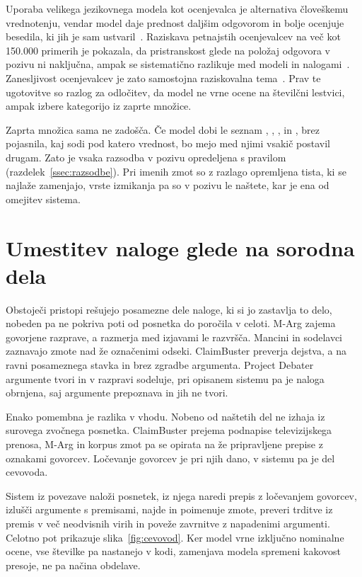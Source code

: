\documentclass[a4paper, 12pt]{book}
\begin{document}
Uporaba velikega jezikovnega modela kot ocenjevalca je alternativa človeškemu
vrednotenju, vendar model daje prednost daljšim odgovorom in bolje ocenjuje
besedila, ki jih je sam ustvaril~\cite{zheng2023judging}. Raziskava petnajstih
ocenjevalcev na več kot 150.000 primerih je pokazala, da pristranskost glede na
položaj odgovora v pozivu ni naključna, ampak se sistematično razlikuje med
modeli in nalogami~\cite{shi2025judging}. Zanesljivost ocenjevalcev je zato
samostojna raziskovalna tema~\cite{gu2024}. Prav te ugotovitve so razlog za
odločitev, da model ne vrne ocene na številčni lestvici, ampak izbere kategorijo
iz zaprte množice.

Zaprta množica sama ne zadošča. Če model dobi le seznam , , ,  in , brez pojasnila, kaj sodi pod katero vrednost, bo mejo med njimi vsakič postavil drugam. Zato je vsaka razsodba v pozivu opredeljena s pravilom (razdelek~\ref{ssec:razsodbe}). Pri imenih zmot so z razlago opremljena tista, ki se najlaže zamenjajo, vrste izmikanja pa so v pozivu le naštete, kar je ena od omejitev sistema.


\section{Umestitev naloge glede na sorodna dela}
\label{sec:umestitev}
Obstoječi pristopi rešujejo posamezne dele naloge, ki si jo zastavlja to delo,
nobeden pa ne pokriva poti od posnetka do poročila v celoti. M-Arg zajema
govorjene razprave, a razmerja med izjavami le razvršča. Mancini in sodelavci
zaznavajo zmote nad že označenimi odseki. ClaimBuster preverja dejstva, a na
ravni posameznega stavka in brez zgradbe argumenta. Project
Debater~\cite{slonim2021} argumente tvori in v razpravi sodeluje, pri opisanem
sistemu pa je naloga obrnjena, saj argumente prepoznava in jih ne tvori.

Enako pomembna je razlika v vhodu. Nobeno od naštetih del ne izhaja iz surovega
zvočnega posnetka. ClaimBuster prejema podnapise televizijskega prenosa, M-Arg
in korpus zmot pa se opirata na že pripravljene prepise z oznakami govorcev.
Ločevanje govorcev je pri njih dano, v sistemu pa je del cevovoda.

Sistem iz povezave naloži posnetek, iz njega naredi prepis z ločevanjem
govorcev, izlušči argumente s premisami, najde in poimenuje zmote, preveri
trditve iz premis v več neodvisnih virih in poveže zavrnitve z napadenimi
argumenti. Celotno pot prikazuje slika~\ref{fig:cevovod}.  Ker model vrne izključno nominalne ocene, vse številke pa nastanejo v kodi, zamenjava modela spremeni kakovost presoje, ne pa načina obdelave.
\end{document}
